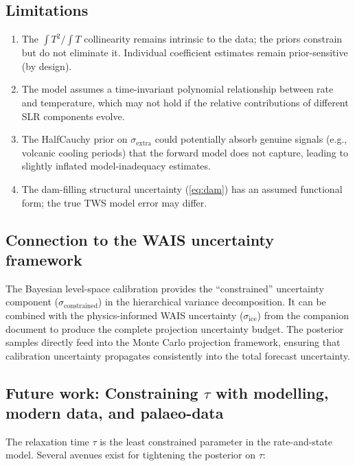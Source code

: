 \documentclass[11pt]{article}
\newcommand{\sigextra}{\sigma_{\text{extra}}}
\begin{document}
\subsection{Limitations}

\begin{enumerate}
  \item The $\int T^2 / \int T$ collinearity remains intrinsic to the data; the priors constrain but do not eliminate it.  Individual coefficient estimates remain prior-sensitive (by design).
  \item The model assumes a time-invariant polynomial relationship between rate and temperature, which may not hold if the relative contributions of different SLR components evolve.
  \item The HalfCauchy prior on $\sigextra$ could potentially absorb genuine signals (e.g., volcanic cooling periods) that the forward model does not capture, leading to slightly inflated model-inadequacy estimates.
  \item The dam-filling structural uncertainty (\cref{eq:dam}) has an assumed functional form; the true TWS model error may differ.
\end{enumerate}

\subsection{Connection to the WAIS uncertainty framework}

The Bayesian level-space calibration provides the ``constrained'' uncertainty component ($\sigma_{\text{constrained}}$) in the hierarchical variance decomposition.  It can be combined with the physics-informed WAIS uncertainty ($\sigma_{\text{ice}}$) from the companion document to produce the complete projection uncertainty budget.  The posterior samples directly feed into the Monte Carlo projection framework, ensuring that calibration uncertainty propagates consistently into the total forecast uncertainty.


\subsection{Future work: Constraining $\tau$ with modelling, modern data, and palaeo-data}

The relaxation time $\tau$ is the least constrained parameter in the rate-and-state model.  Several avenues exist for tightening the posterior on $\tau$:
\end{document}
